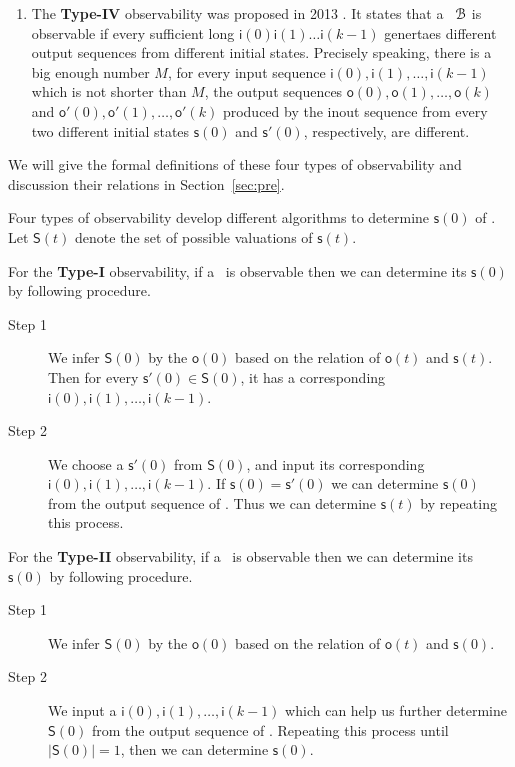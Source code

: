 \begin{enumerate}
	\item  The  {\bf Type-IV}  observability was  proposed in 2013 \cite{Fornasini2013Observability}. It states that a \BCN\ ${\mathcal{B}}$ is observable if every sufficient long $\mathsf{i}(0)$$\mathsf{i}(1)\ldots$$\mathsf{i}(k-1)$ genertaes different output sequences  from different initial states. Precisely speaking, there is a big enough number $M$, for every  input sequence $\mathsf{i}(0),\mathsf{i}(1),\ldots, \mathsf{i}(k-1)$ which is not shorter than $M$, the output sequences $\mathsf{o}(0), \mathsf{o}(1), \ldots, \mathsf{o}(k)$ and  $\mathsf{o}'(0), \mathsf{o}'(1), \ldots, \mathsf{o}'(k)$ produced by the inout sequence from every two different initial states $\mathsf{s}(0)$ and $\mathsf{s}'(0)$, respectively, are different.
\end{enumerate}
 We will give the formal definitions of these four types of observability and discussion their relations in Section~\ref{sec:pre}.

Four types of observability develop different algorithms to determine $\mathsf{s}(0)$ of \BCN. Let $\mathsf{S}(t)$ denote the set of possible valuations of $\mathsf{s}(t)$.

For the {\bf Type-I} observability, if a \BCN\ is observable then we can determine its $\mathsf{s}(0)$ by following procedure. 
\begin{description}
	\item[Step 1] We infer $\mathsf{S}(0)$ by the $\mathsf{o}(0)$ based on the relation of $\mathsf{o}(t)$ and $\mathsf{s}(t)$. Then for every $\mathsf{s}'(0)\in\mathsf{S}(0)$, it has a corresponding $\mathsf{i}(0),\mathsf{i}(1),\ldots,\mathsf{i}(k-1)$.
	\item[Step 2] We choose a $\mathsf{s}'(0)$ from $\mathsf{S}(0)$, and input its corresponding $\mathsf{i}(0),\mathsf{i}(1),\ldots,\mathsf{i}(k-1)$. If $\mathsf{s}(0)=\mathsf{s}'(0)$ we can determine $\mathsf{s}(0)$ from the output sequence of \BCN. Thus we can determine $\mathsf{s}(t)$ by repeating this process.
	
\end{description}

 For the {\bf Type-II} observability, if a \BCN\ is observable then we can determine its $\mathsf{s}(0)$ by following procedure. 
\begin{description}
	\item[Step 1] We infer $\mathsf{S}(0)$ by the $\mathsf{o}(0)$ based on the relation of $\mathsf{o}(t)$ and $\mathsf{s}(0)$. 
	\item[Step 2] We input a $\mathsf{i}(0),\mathsf{i}(1),\ldots,\mathsf{i}(k-1)$ which can help us further determine $\mathsf{S}(0)$ from the output sequence of \BCN. Repeating this process until $|\mathsf{S}(0)|=1$, then we can determine $\mathsf{s}(0)$.
	
\end{description}

